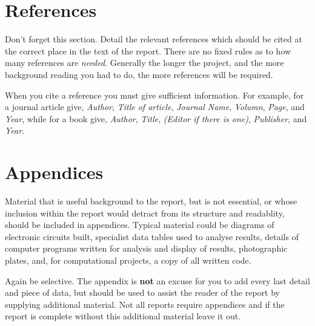 \documentclass[a4paper,12pt]{article}
\begin{document}
\section{References}

Don't forget this section. Detail the relevant references which
should be cited at the correct place in the text of the report. There
are no fixed rules as to how many references are {\it needed}. Generally
the longer the project, and the more background reading you had to do,
the more references will be required. 

When you cite a reference you must give sufficient information. For
example, for a journal article give, {\it Author}, {\it Title of
article},
{\it Journal Name}, {\it Volumn}, {\it Page}, and {\it Year}, 
while for a book give, {\it Author}, {\it Title},
{\it (Editor if there is one)}, {\it Publisher}, and {\it Year}.        
\appendix
\section{Appendices}

Material that is useful background to the report, but is not essential,
or whose inclusion within the report  would detract from its
structure and readablity, should be included in appendices. Typical
material could be diagrams of electronic circuits built, specialist
data tables used to analyse results, details of computer programs
written for analysis and display of results, photographic plates,
and, for computational projects, a copy of all written code.

Again be selective. The appendix is {\bf not} an excuse for you to add every
last detail and piece of data, but should be used to assist the reader
of the report by supplying additional material. Not all reports require
appendices and if the report is complete without this additional
material leave it out.
\end{document}
